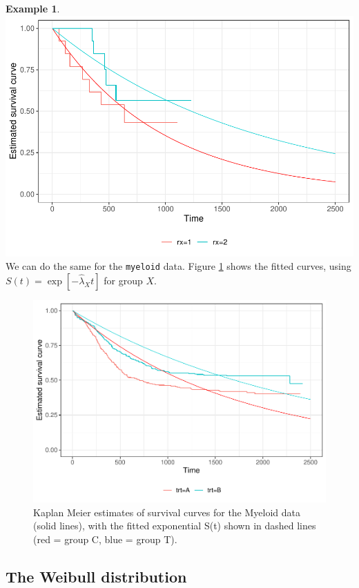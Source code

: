 \documentclass[
  openany]{book}
\theoremstyle{definition}
\theoremstyle{definition}
\newtheorem{example}{Example}[chapter]
\theoremstyle{definition}
\theoremstyle{definition}
\theoremstyle{remark}
\begin{document}
\begin{example}
\includegraphics{CT4H_notes_files/figure-latex/ovplotlr-1.pdf}
We can do the same for the \texttt{myeloid} data. Figure \ref{fig:myplotlr} shows the fitted curves, using \(S\left(t\right)=\exp\left[-\hat{\lambda}_Xt\right]\) for group \(X\).

\begin{figure}
\centering
\includegraphics{CT4H_notes_files/figure-latex/myplotlr-1.pdf}
\caption{\label{fig:myplotlr}Kaplan Meier estimates of survival curves for the Myeloid data (solid lines), with the fitted exponential S(t) shown in dashed lines (red = group C, blue = group T).}
\end{figure}

\end{example}

\subsection{The Weibull distribution}\label{weibull}
\end{document}
